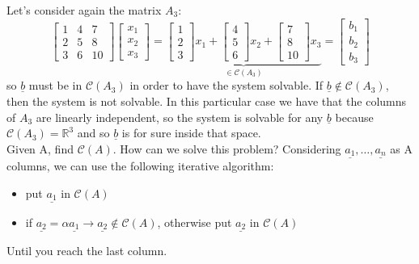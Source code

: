 Let's consider again the matrix $A_3$:
\[
\begin{bmatrix}
    1 & 4 & 7\\
    2 & 5 & 8\\
    3 & 6 & 10
\end{bmatrix}
\begin{bmatrix}
    x_1\\
    x_2\\
    x_3
\end{bmatrix}
= 
\underbrace{\begin{bmatrix}
    1\\
    2\\
    3
\end{bmatrix}
x_1+
\begin{bmatrix}
    4\\
    5\\
    6
\end{bmatrix}
x_2+
\begin{bmatrix}
    7\\
    8\\
    10
\end{bmatrix}
x_3}_{\in \mathcal{C}(A_3)}
=
\begin{bmatrix}
    b_1\\
    b_2\\
    b_3
\end{bmatrix}
\]
so $\underline{b}$ must be in $\mathcal{C}(A_3)$ in order to have the system solvable. If $\underline{b} \notin \mathcal{C}(A_3)$, then the system is not solvable. In this particular case we have that the columns of $A_3$ are linearly independent, so the system is solvable for any $\underline{b}$ because $\mathcal{C}(A_3) = \mathbb{R}^3$ and so $\underline{b}$ is for sure inside that space. \\

Given A, find $\mathcal{C}(A)$. How can we solve this problem? Considering $\underline{a_1}, \dots, \underline{a_n}$ as A columns, we can use the following iterative algorithm:
\begin{itemize}
    \item put $\underline{a_1}$ in $\mathcal{C}(A)$
    \item if $\underline{a_2} = \alpha \underline{a_1} \rightarrow \underline{a_2} \notin \mathcal{C}(A)$, otherwise put $\underline{a_2}$ in $\mathcal{C}(A)$
\end{itemize}
Until you reach the last column.

